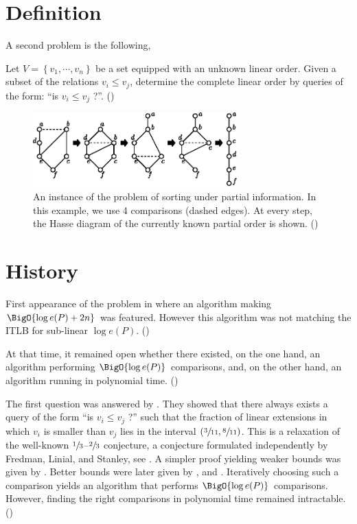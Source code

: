 
\section{Definition}

A second problem is the following,

Let $V = \left\{{v_1 , \cdots , v_n }\right\}$ be a set equipped with an unknown linear order. Given a subset of the relations $v_i \leq v_j$, determine the complete linear order by queries of the form: ``is $v_i \leq v_j$ ?''. (\cite{cardinal2013sorting})


\begin{figure}
	\centering
	\includegraphics[width=0.7\textwidth]{fig/supi/ex1}
	\caption{\label{fig:supi/ex1} An instance of the problem of sorting under partial information. In this example, we use 4 comparisons (dashed edges). At every step, the Hasse diagram of the currently known partial order is shown. (\cite{cardinal2013sorting})}
\end{figure}


\section{History}

First appearance of the problem in \cite{fredman1976good} where an algorithm making $\BigO{\log e(P) + 2n}$ was featured. However this algorithm was not matching the ITLB for sub-linear $\log e(P)$. (\cite{cardinal2013sorting})

At that time, it remained open whether there existed, on the one hand, an algorithm performing $\BigO{\log e(P)}$ comparisons, and, on the other hand, an algorithm running in polynomial time. (\cite{cardinal2013sorting})

The first question was answered by \cite{kahn1984balancing}. They showed that there always exists a query of the form ``is $v_i \leq v_j$ ?'' such that the fraction of linear extensions in which $v_i$ is smaller than $v_j$ lies in the interval $(\sfrac{3}{11}, \sfrac{8}{11})$. This is a relaxation of the well-known $\sfrac{1}{3}$--$\sfrac{2}{3}$ conjecture, a conjecture formulated independently by Fredman, Linial, and Stanley, see \cite{linial1984information}. A simpler proof yielding weaker bounds was given by \cite{kahn1991balancing}. Better bounds were later given by \cite{brightwell1995balancing}, and \cite{brightwell1999balanced}. Iteratively choosing such a comparison yields an algorithm that performs $\BigO{\log e(P)}$ comparisons. However, finding the right comparisons in polynomial time remained intractable. (\cite{cardinal2013sorting})




